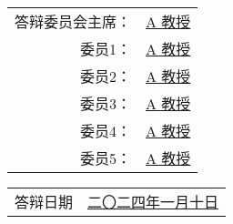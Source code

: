\vskip 6pt

\begin{center}
    \begin{tabularx}{.7\textwidth}{>{\fangsong}r >{\fangsong}X<{\centering}}
        答辩委员会主席： & \uline{\hfill A 教授 \hfill} \\
        委员1： & \uline{\hfill A 教授 \hfill} \\
        委员2： & \uline{\hfill A 教授 \hfill} \\
        委员3： & \uline{\hfill A 教授 \hfill} \\
        委员4： & \uline{\hfill A 教授 \hfill} \\
        委员5： & \uline{\hfill A 教授 \hfill} \\
    \end{tabularx}
\end{center}

\vskip 6pt

\begin{center}
    \begin{tabularx}{.45\textwidth}{>{\fangsong}l >{\fangsong}X<{\centering}}
        答辩日期 & \uline{\hfill 二〇二四年一月十日 \hfill} \\
    \end{tabularx}
\end{center}
